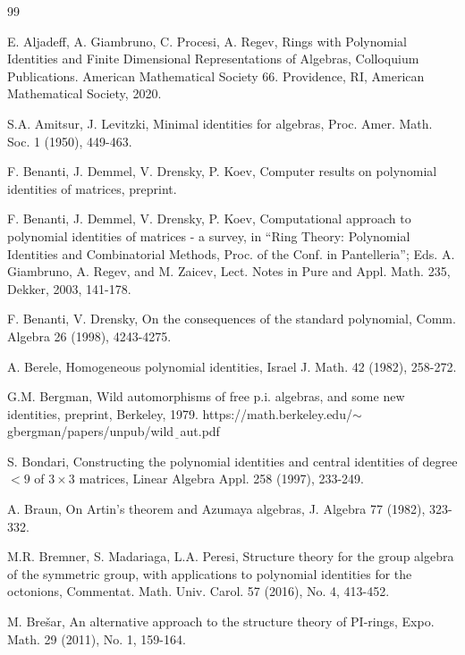 \documentclass[12pt]{amsart}
\theoremstyle{definition}
\begin{document}
\begin{thebibliography}{99}

 E. Aljadeff, A. Giambruno, C. Procesi, A. Regev,
Rings with Polynomial Identities and Finite Dimensional Representations of Algebras,
Colloquium Publications.
American Mathematical Society 66. Providence, RI, American Mathematical Society, 2020.

S.A. Amitsur, J. Levitzki, Minimal identities for
algebras, Proc. Amer. Math. Soc. 1 (1950), 449-463.

F. Benanti, J. Demmel, V. Drensky, P. Koev,
Computer results on polynomial identities of matrices, preprint.

F. Benanti, J. Demmel, V. Drensky, P. Koev,
Computational approach to polynomial identities of  matrices - a survey,
in ``Ring Theory: Polynomial Identities and Combinatorial Methods, Proc. of the Conf. in Pantelleria'';
Eds. A. Giambruno, A. Regev, and M. Zaicev, Lect. Notes in Pure and Appl. Math. 235, Dekker, 2003, 141-178.

F. Benanti, V. Drensky,
On the consequences of the standard polynomial,
Comm. Algebra 26 (1998), 4243-4275.

A. Berele,
Homogeneous polynomial identities,
Israel J. Math. 42 (1982), 258-272.

G.M. Bergman,
Wild automorphisms of free p.i. algebras, and some new identities,
preprint, Berkeley, 1979. %
\newline https://math.berkeley.edu/$\sim$gbergman/papers/unpub/wild$\underline{\phantom{a}}$aut.pdf

S. Bondari,
Constructing the polynomial identities and central identities of degree $<9$ of $3\times 3$ matrices,
Linear Algebra Appl. 258 (1997), 233-249.

A. Braun,
On Artin's theorem and Azumaya algebras,
J. Algebra 77 (1982), 323-332.

M.R. Bremner, S. Madariaga, L.A. Peresi,
Structure theory for the group algebra of the symmetric group, with applications to polynomial identities for the octonions,
Commentat. Math. Univ. Carol. 57  (2016), No. 4, 413-452.

M. Bre\v{s}ar,
An alternative approach to the structure theory of PI-rings,
Expo. Math. 29 (2011), No. 1, 159-164.


\end{thebibliography}
\end{document}

